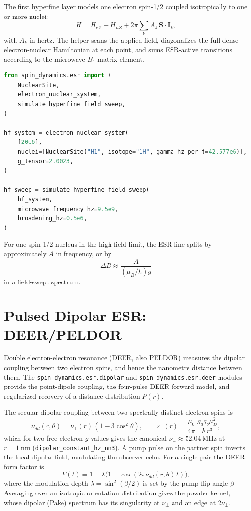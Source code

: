 \documentclass[11pt,oneside]{report}
\newcommand{\code}[1]{\texttt{#1}}
\begin{document}
The first hyperfine layer models one electron spin-1/2 coupled isotropically to
one or more nuclei:
\[
  H =
    H_{eZ} + H_{nZ}
    + 2\pi\sum_k A_k\,\mathbf{S}\cdot\mathbf{I}_k ,
\]
with \(A_k\) in hertz. The helper scans the applied field, diagonalizes the
full dense electron-nuclear Hamiltonian at each point, and sums ESR-active
transitions according to the microwave \(B_1\) matrix element.

\begin{lstlisting}[language=Python]
from spin_dynamics.esr import (
    NuclearSite,
    electron_nuclear_system,
    simulate_hyperfine_field_sweep,
)

hf_system = electron_nuclear_system(
    [20e6],
    nuclei=[NuclearSite("H1", isotope="1H", gamma_hz_per_t=42.577e6)],
    g_tensor=2.0023,
)

hf_sweep = simulate_hyperfine_field_sweep(
    hf_system,
    microwave_frequency_hz=9.5e9,
    broadening_hz=0.5e6,
)
\end{lstlisting}

For one spin-1/2 nucleus in the high-field limit, the ESR line splits by
approximately \(A\) in frequency, or by
\[
  \Delta B \approx \frac{A}{(\mu_B/h)g}
\]
in a field-swept spectrum.

\section{Pulsed Dipolar ESR: DEER/PELDOR}
\label{sec:deer}

Double electron-electron resonance (DEER, also PELDOR) measures the dipolar
coupling between two electron spins, and hence the nanometre distance between
them. The \code{spin\_dynamics.esr.dipolar} and \code{spin\_dynamics.esr.deer}
modules provide the point-dipole coupling, the four-pulse DEER forward model,
and regularized recovery of a distance distribution \(P(r)\).

The secular dipolar coupling between two spectrally distinct electron spins is
\[
  \nu_{dd}(r,\theta) = \nu_\perp(r)\,(1 - 3\cos^2\theta),
  \qquad
  \nu_\perp(r) = \frac{\mu_0}{4\pi}\,\frac{g_a g_b \mu_B^2}{h\,r^3},
\]
which for two free-electron \(g\) values gives the canonical
\(\nu_\perp \approx 52.04~\mathrm{MHz}\) at \(r = 1~\mathrm{nm}\)
(\code{dipolar\_constant\_hz\_nm3}). A pump pulse on the partner spin inverts the
local dipolar field, modulating the observer echo. For a single pair the DEER
form factor is
\[
  F(t) = 1 - \lambda\bigl(1 - \cos(2\pi\nu_{dd}(r,\theta)\,t)\bigr),
\]
where the modulation depth \(\lambda = \sin^2(\beta/2)\) is set by the pump flip
angle \(\beta\). Averaging over an isotropic orientation distribution gives the
powder kernel, whose dipolar (Pake) spectrum has its singularity at
\(\nu_\perp\) and an edge at \(2\nu_\perp\).
\end{document}
